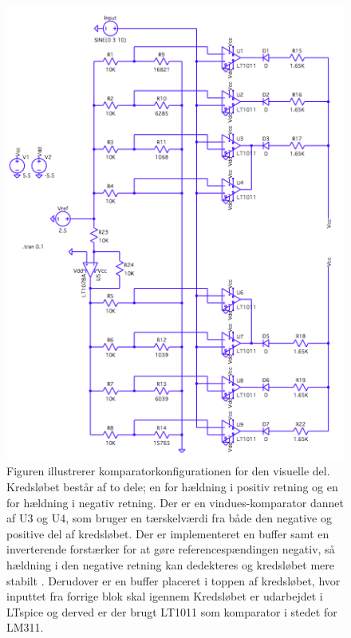 \begin{figure}[H]
	\centering
	\includegraphics[scale=0.7]{figures/cProblemloesning/komparator_visuel1.PNG}
	\caption{Figuren illustrerer komparatorkonfigurationen for den visuelle del. Kredsløbet består af to dele; en for hældning i positiv retning og en for hældning i negativ retning. Der er en vindues-komparator dannet af  U$3$ og U$4$, som bruger en tærskelværdi fra både den negative og positive del af kredsløbet. Der er implementeret en buffer samt en inverterende forstærker for at gøre referencespændingen negativ, så hældning i den negative retning kan dedekteres og  kredsløbet mere stabilt . Derudover er en buffer placeret i toppen af kredsløbet, hvor inputtet fra forrige blok skal igennem    Kredsløbet er udarbejdet i LTspice og derved er der brugt LT1011 som komparator i stedet for LM311.}
	\label{fig:komparator_visuel}
\end{figure}


